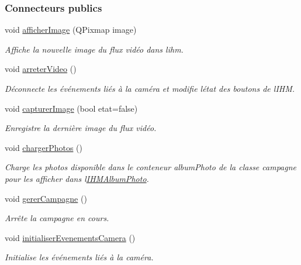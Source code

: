 \subsubsection*{Connecteurs publics}
\begin{DoxyCompactItemize}
\item 
void \hyperlink{class_i_h_m_rov_ae6e1c32c5dea20eb835f5c9036de8a5b}{afficher\+Image} (Q\+Pixmap image)
\begin{DoxyCompactList}\small\item\em Affiche la nouvelle image du flux vidéo dans l\textquotesingle{}ihm. \end{DoxyCompactList}\item 
void \hyperlink{class_i_h_m_rov_a81335964f1443d11e0929017b2f21267}{arreter\+Video} ()
\begin{DoxyCompactList}\small\item\em Déconnecte les événements liés à la caméra et modifie l\textquotesingle{}état des boutons de l\textquotesingle{}I\+HM. \end{DoxyCompactList}\item 
void \hyperlink{class_i_h_m_rov_a15fe4fd090a0171bb9ad24e28d3b978a}{capturer\+Image} (bool etat=false)
\begin{DoxyCompactList}\small\item\em Enregistre la dernière image du flux vidéo. \end{DoxyCompactList}\item 
void \hyperlink{class_i_h_m_rov_aae5c264f7a1b6d27c1d2e25574c88c5b}{charger\+Photos} ()
\begin{DoxyCompactList}\small\item\em Charge les photos disponible dans le conteneur album\+Photo de la classe campagne pour les afficher dans l\textquotesingle{}\hyperlink{class_i_h_m_album_photo}{I\+H\+M\+Album\+Photo}. \end{DoxyCompactList}\item 
void \hyperlink{class_i_h_m_rov_a3660d3b4bf61367534eae9d0c3618a5e}{gerer\+Campagne} ()
\begin{DoxyCompactList}\small\item\em Arrête la campagne en cours. \end{DoxyCompactList}\item 
void \hyperlink{class_i_h_m_rov_a955daa231d959666fa7ed01346b2b6ef}{initialiser\+Evenements\+Camera} ()
\begin{DoxyCompactList}\small\item\em Initialise les événements liés à la caméra. \end{DoxyCompactList}\item 

\end{DoxyCompactItemize}
